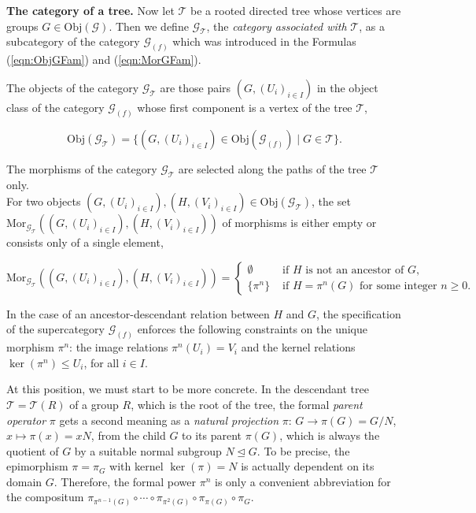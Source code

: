 \documentclass{amsart}
\theoremstyle{definition}
\numberwithin{equation}{section}
\begin{document}
\noindent
\textbf{The category of a tree.}
Now let \(\mathcal{T}\) be a rooted directed tree
whose vertices are groups \(G\in\mathrm{Obj}(\mathcal{G})\).
Then we define \(\mathcal{G}_{\mathcal{T}}\), the \textit{category associated with} \(\mathcal{T}\),
as a subcategory of the category \(\mathcal{G}_{(f)}\)
which was introduced in the Formulas
(\ref{eqn:ObjGFam})
and
(\ref{eqn:MorGFam}).

The objects of the category \(\mathcal{G}_{\mathcal{T}}\) are those pairs \((G,(U_i)_{i\in I})\)
in the object class of the category \(\mathcal{G}_{(f)}\)
whose first component is a vertex of the tree \(\mathcal{T}\),

\begin{equation}
\label{eqn:ObjGTree}
\mathrm{Obj}(\mathcal{G}_{\mathcal{T}})=\lbrace (G,(U_i)_{i\in I})\in\mathrm{Obj}(\mathcal{G}_{(f)})\mid
G\in\mathcal{T}\rbrace.
\end{equation}

\noindent
The morphisms of the category \(\mathcal{G}_{\mathcal{T}}\)
are selected along the paths of the tree \(\mathcal{T}\) only.\\
For two objects \((G,(U_i)_{i\in I}),(H,(V_i)_{i\in I})\in\mathrm{Obj}(\mathcal{G}_{\mathcal{T}})\),
the set \(\mathrm{Mor}_{\mathcal{G}_{\mathcal{T}}}((G,(U_i)_{i\in I}),(H,(V_i)_{i\in I}))\) of morphisms
is either empty or consists only of a single element,

\begin{equation}
\label{eqn:MorGTree}
\mathrm{Mor}_{\mathcal{G}_{\mathcal{T}}}((G,(U_i)_{i\in I}),(H,(V_i)_{i\in I}))=
\begin{cases}
\emptyset & \text{ if } H \text{ is not an ancestor of } G, \\
\lbrace\pi^n\rbrace & \text{ if } H=\pi^n(G) \text{ for some integer } n\ge 0.
\end{cases}
\end{equation}

\noindent
In the case of an ancestor-descendant relation between \(H\) and \(G\),
the specification of the supercategory \(\mathcal{G}_{(f)}\) enforces the following constraints
on the unique morphism \(\pi^n\):
the image relations \(\pi^n(U_i)=V_i\) and the kernel relations \(\ker(\pi^n)\le U_i\), for all \(i\in I\).


At this position, we must start to be more concrete.
In the descendant tree \(\mathcal{T}=\mathcal{T}(R)\) of a group \(R\), which is the root of the tree,
the formal \textit{parent operator} \(\pi\) gets a second meaning as a \textit{natural projection}
\(\pi:\,G\to\pi(G)=G/N\), \(x\mapsto\pi(x)=xN\),
from the child \(G\) to its parent \(\pi(G)\),
which is always the quotient of \(G\) by a suitable normal subgroup \(N\unlhd G\).
To be precise, the epimorphism \(\pi=\pi_G\) with kernel \(\ker(\pi)=N\) is actually dependent on its domain \(G\).
Therefore, the formal power \(\pi^n\) is only a convenient abbreviation for
the compositum \(\pi_{\pi^{n-1}(G)}\circ\cdots\circ\pi_{\pi^2(G)}\circ\pi_{\pi(G)}\circ\pi_{G}\).
\end{document}
